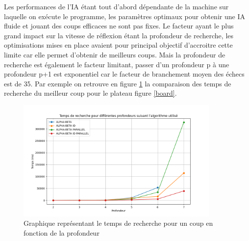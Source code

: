 \documentclass{article}
\begin{document}
Les performances de l'IA étant tout d'abord dépendante de la machine sur laquelle on exécute le programme, les paramètres optimaux pour obtenir une IA fluide et jouant des coups efficaces 
ne sont pas fixes. Le facteur ayant le plus grand impact sur la vitesse de réflexion étant la profondeur de recherche, les optimisations mises en place avaient pour principal objectif d'accroitre
cette limite car elle permet d'obtenir de meilleurs coups. Mais la profondeur de recherche est également le facteur limitant, passer d'un profondeur p à une profondeur p+1 est exponentiel car le facteur
de branchement moyen des échecs est de 35. Par exemple on retrouve en figure \ref{plot} la comparaison des temps de recherche du meilleur coup pour le plateau figure \ref{board}.

\begin{figure}[h]
    \centering
    \includegraphics[width=\textwidth,height=6.0cm,keepaspectratio]{plot_depth.png}
    \caption{Graphique représentant le temps de recherche pour un coup en fonction de la profondeur}
    \label{plot}
\end{figure}
\end{document}
